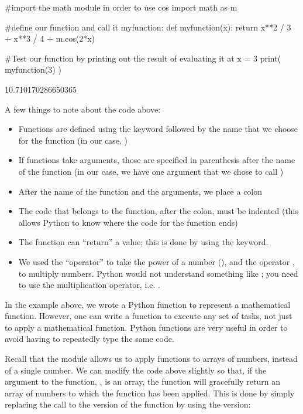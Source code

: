 \begin{python}[caption=Defining a function] 
#import the math module in order to use cos
import math as m

#define our function and call it myfunction:
def myfunction(x):
  return x**2 / 3 + x**3 / 4 + m.cos(2*x)
  
#Test our function by printing out the result of evaluating it at x = 3
print( myfunction(3) )  
\end{python}
\begin{poutput}
10.710170286650365
\end{poutput}
A few things to note about the code above:
\begin{itemize}
\item Functions are defined using the  keyword followed by the name that we choose for the function (in our case, )
\item If functions take arguments, those are specified in parenthesis after the name of the function (in our case, we have one argument that we chose to call )
\item After the name of the function and the arguments, we place a colon
\item The code that belongs to the function, after the colon, must be indented (this allows Python to know where the code for the function ends)
\item The function can ``return'' a value; this is done by using the  keyword. 
\item We used the ``operator'' \code{**} to take the power of a number (), and the operator \code{*}, to multiply numbers. Python would not understand something like ; you need to use the multiplication operator, i.e. .
\end{itemize}
In the example above, we wrote a Python function to represent a mathematical function. However, one can write a function to execute any set of tasks, not just to apply a mathematical function. Python functions are very useful in order to avoid having to repeatedly type the same code. 


Recall that the  module allows us to apply functions to arrays of numbers, instead of a single number. We can modify the code above slightly so that, if the argument to the function, , is an array, the function will gracefully return an array of numbers to which the function has been applied. This is done by simply replacing the call to the  version of the  function by using the  version:

